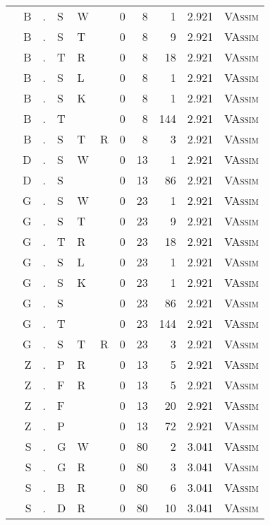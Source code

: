 \begin{longtable}{r@{ } r@{ } c@{ } l@{ } l@{ } l@{ } r r r r l }
  & B & . & S & W &   & 0 & 8 & 1 & 2.921 & \textsc{VAssim} \\
  & B & . & S & T &   & 0 & 8 & 9 & 2.921 & \textsc{VAssim} \\
  & B & . & T & R &   & 0 & 8 & 18 & 2.921 & \textsc{VAssim} \\
  & B & . & S & L &   & 0 & 8 & 1 & 2.921 & \textsc{VAssim} \\
  & B & . & S & K &   & 0 & 8 & 1 & 2.921 & \textsc{VAssim} \\
  & B & . & T &   &   & 0 & 8 & 144 & 2.921 & \textsc{VAssim} \\
  & B & . & S & T & R & 0 & 8 & 3 & 2.921 & \textsc{VAssim} \\
  & D & . & S & W &   & 0 & 13 & 1 & 2.921 & \textsc{VAssim} \\
  & D & . & S &   &   & 0 & 13 & 86 & 2.921 & \textsc{VAssim} \\
  & G & . & S & W &   & 0 & 23 & 1 & 2.921 & \textsc{VAssim} \\
  & G & . & S & T &   & 0 & 23 & 9 & 2.921 & \textsc{VAssim} \\
  & G & . & T & R &   & 0 & 23 & 18 & 2.921 & \textsc{VAssim} \\
  & G & . & S & L &   & 0 & 23 & 1 & 2.921 & \textsc{VAssim} \\
  & G & . & S & K &   & 0 & 23 & 1 & 2.921 & \textsc{VAssim} \\
  & G & . & S &   &   & 0 & 23 & 86 & 2.921 & \textsc{VAssim} \\
  & G & . & T &   &   & 0 & 23 & 144 & 2.921 & \textsc{VAssim} \\
  & G & . & S & T & R & 0 & 23 & 3 & 2.921 & \textsc{VAssim} \\
  & Z & . & P & R &   & 0 & 13 & 5 & 2.921 & \textsc{VAssim} \\
  & Z & . & F & R &   & 0 & 13 & 5 & 2.921 & \textsc{VAssim} \\
  & Z & . & F &   &   & 0 & 13 & 20 & 2.921 & \textsc{VAssim} \\
  & Z & . & P &   &   & 0 & 13 & 72 & 2.921 & \textsc{VAssim} \\
  & S & . & G & W &   & 0 & 80 & 2 & 3.041 & \textsc{VAssim} \\
  & S & . & G & R &   & 0 & 80 & 3 & 3.041 & \textsc{VAssim} \\
  & S & . & B & R &   & 0 & 80 & 6 & 3.041 & \textsc{VAssim} \\
  & S & . & D & R &   & 0 & 80 & 10 & 3.041 & \textsc{VAssim} \\

\end{longtable}
